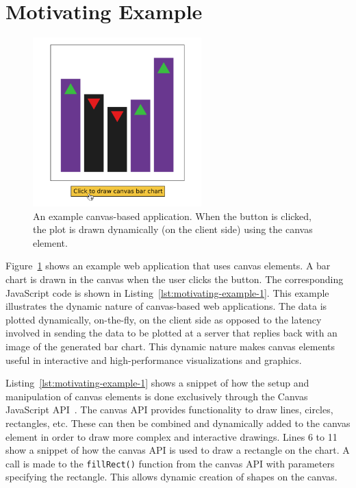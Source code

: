 \section{Motivating Example}\label{sec:motivating}

\begin{figure}[t]
    \centering
    \includegraphics[trim={0.1cm 0.1cm 0.1cm 0.1cm},clip,width=0.58\textwidth,height=0.36\textheight]{testability/figures/motivating-example-new.png}
    \caption{An example canvas-based application. When the button is clicked, the plot is drawn dynamically (on the client side) using the canvas element.}
    \label{fig:motivating-example-1}
\end{figure}


Figure~\ref{fig:motivating-example-1} shows an example web application that uses canvas elements.
A bar chart is drawn in the canvas when the user clicks the button.
The corresponding JavaScript code is shown in Listing~\ref{lst:motivating-example-1}.
This example illustrates the dynamic nature of canvas-based web applications.
The data is plotted dynamically, on-the-fly, on the client side as opposed to the latency involved in sending the data to be plotted at a server that replies back with an image of the generated bar chart.
This dynamic nature makes canvas elements useful in interactive and high-performance visualizations and graphics.

Listing~\ref{lst:motivating-example-1} shows a snippet of how the setup and manipulation of canvas elements is done exclusively through the Canvas JavaScript API~\cite{w3c_canvas_standard}.
The canvas API provides functionality to draw lines, circles, rectangles, etc.
These can then be combined and dynamically added to the canvas element in order to draw more complex and interactive drawings.
Lines 6 to 11 show a snippet of how the canvas API is used to draw a rectangle on the chart.
A call is made to the \verb|fillRect()| function from the canvas API with parameters specifying the rectangle.
This allows dynamic creation of shapes on the canvas.

